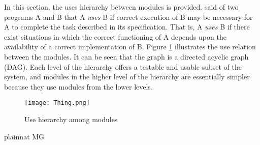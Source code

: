 \documentclass[12pt, titlepage]{article}
\begin{document}
In this section, the uses hierarchy between modules is
provided. \citet{Parnas1978} said of two programs A and B that A {\em uses} B if
correct execution of B may be necessary for A to complete the task described in
its specification. That is, A {\em uses} B if there exist situations in which
the correct functioning of A depends upon the availability of a correct
implementation of B.  Figure \ref{FigUH} illustrates the use relation between
the modules. It can be seen that the graph is a directed acyclic graph
(DAG). Each level of the hierarchy offers a testable and usable subset of the
system, and modules in the higher level of the hierarchy are essentially simpler
because they use modules from the lower levels.

\begin{figure}[H]
\centering
\texttt{[image: Thing.png]}
\caption{Use hierarchy among modules}
\label{FigUH}
\end{figure}


 {plainnat}
 {MG}
\end{document}

